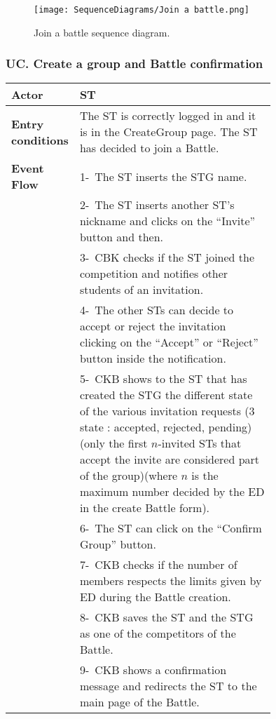 \begin{figure}[H]
    \begin{center}
        \texttt{[image: SequenceDiagrams/Join a battle.png]}
        \caption{Join a battle sequence diagram.}
        \label{fig:join_a_battle_seqd}%
    \end{center}
\end{figure}

\newpage

\subsubsection*{UC\cuc . Create a group and Battle confirmation}
\begin{center}
    \begin{longtable}{|l|p{0.75\linewidth}|}
        \hline
        \textbf{Actor}            & ST   \\
        \hline
        \textbf{Entry conditions} & The ST is correctly logged in and it is in the CreateGroup page. The ST has decided to join a Battle.        \\
        \hline
        \textbf{Event Flow}       & 1-\ The ST inserts the STG name.        \\
        & 2-\ The ST inserts another ST's nickname and clicks on the “Invite” button and then.        \\
        & 3-\ CBK checks if the ST joined the competition and notifies other students of an invitation.  \\
        & 4-\ The other STs can decide to accept or reject the invitation clicking on the “Accept” or “Reject” button inside the notification.        \\
        & 5-\ CKB shows to the ST that has created the STG the different state of the various invitation requests (3 state : accepted, rejected, pending)(only the first \(n\)-invited STs that accept the invite are considered part of the group)(where \(n\) is the maximum number decided by the ED in the create Battle form).         \\
        & 6-\ The ST can click on the “Confirm Group” button.        \\
        & 7-\ CKB checks if the number of members respects the limits given by ED during the Battle creation.         \\
        & 8-\ CKB saves the ST and the STG as one of the competitors of the Battle.        \\
        & 9-\ CKB shows a confirmation message and redirects the ST to the main page of the Battle.        \\

\end{longtable}
\end{center}
